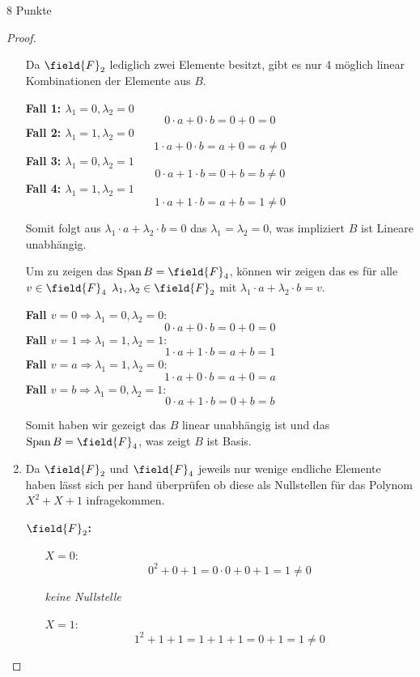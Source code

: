 \documentclass{problemset}
\begin{document}
\begin{problem}{8 Punkte}
\begin{proof}
\begin{enumerate}
		      Da $\field{F}_2$ lediglich zwei Elemente besitzt, gibt es nur 4 möglich linear Kombinationen der Elemente aus $B$.

		      \textbf{Fall 1: $\lambda_1 = 0, \lambda_2 = 0$}
		      \[
			      0 \cdot a + 0 \cdot b = 0 + 0 = 0
		      \]
		      \textbf{Fall 2: $\lambda_1 = 1, \lambda_2 = 0$}
		      \[
			      1 \cdot a + 0 \cdot b = a + 0 = a \neq 0
		      \]
		      \textbf{Fall 3: $\lambda_1 = 0, \lambda_2 = 1$}
		      \[
			      0 \cdot a + 1 \cdot b = 0 + b = b \neq 0
		      \]
		      \textbf{Fall 4: $\lambda_1 = 1, \lambda_2 = 1$}
		      \[
			      1 \cdot a + 1 \cdot b = a + b = 1 \neq 0
		      \]

		      Somit folgt aus $\lambda_1 \cdot a + \lambda_2 \cdot b = 0$ das $\lambda_1 = \lambda_2 = 0$, was impliziert $B$ ist Lineare unabhängig. \checkmark

		      Um zu zeigen das $\operatorname{Span} B = \field{F}_4$, können wir zeigen das es für alle $v \in \field{F}_4$ $\lambda_1, \lambda_2 \in \field{F}_2$ mit $\lambda_1 \cdot a + \lambda_2 \cdot b = v$.

		      \textbf{Fall $v = 0 \Rightarrow \lambda_1 = 0, \lambda_2 = 0$}:
		      \[
			      0 \cdot a + 0 \cdot b = 0 + 0 = 0
		      \]
		      \textbf{Fall $v = 1 \Rightarrow \lambda_1 = 1, \lambda_2 = 1$}:
		      \[
			      1 \cdot a + 1 \cdot b = a + b = 1
		      \]
		      \textbf{Fall $v = a \Rightarrow \lambda_1 = 1, \lambda_2 = 0$}:
		      \[
			      1 \cdot a + 0 \cdot b = a + 0 = a
		      \]
		      \textbf{Fall $v = b \Rightarrow \lambda_1 = 0, \lambda_2 = 1$}:
		      \[
			      0 \cdot a + 1 \cdot b = 0 + b = b
		      \]

		      Somit haben wir gezeigt das $B$ linear unabhängig ist und das $\operatorname{Span} B = \field{F}_4$, was zeigt $B$ ist Basis.
		\item Da $\field{F}_2$ und $\field{F}_4$ jeweils nur wenige endliche Elemente haben lässt sich per hand überprüfen ob diese als Nullstellen für das Polynom $X^2 + X + 1$ infragekommen.

		      \textbf{$\field{F}_2$:}
		      \begin{itemize}
			      \item [$X = 0$:]
			            \[
				            0^2 + 0 + 1 = 0 \cdot 0 + 0 + 1 = 1 \neq 0
			            \]

			            \textit{keine Nullstelle}

			      \item [$X = 1$:]
			            \[
				            1^2 + 1 + 1 = 1 + 1 + 1 = 0 + 1 = 1 \neq 0
			            \]


\end{itemize}
\end{enumerate}
\end{proof}
\end{problem}
\end{document}
